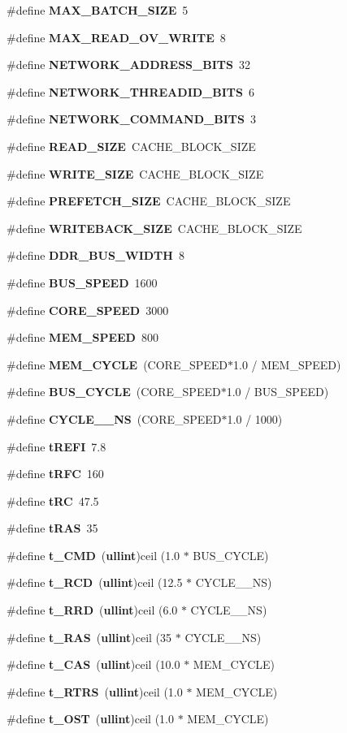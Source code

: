 \begin{CompactItemize}
\#define {\bf MAX\_\-BATCH\_\-SIZE}~5
\item 
\#define {\bf MAX\_\-READ\_\-OV\_\-WRITE}~8
\item 
\#define {\bf NETWORK\_\-ADDRESS\_\-BITS}~32
\item 
\#define {\bf NETWORK\_\-THREADID\_\-BITS}~6
\item 
\#define {\bf NETWORK\_\-COMMAND\_\-BITS}~3
\item 
\#define {\bf READ\_\-SIZE}~CACHE\_\-BLOCK\_\-SIZE
\item 
\#define {\bf WRITE\_\-SIZE}~CACHE\_\-BLOCK\_\-SIZE
\item 
\#define {\bf PREFETCH\_\-SIZE}~CACHE\_\-BLOCK\_\-SIZE
\item 
\#define {\bf WRITEBACK\_\-SIZE}~CACHE\_\-BLOCK\_\-SIZE
\item 
\#define {\bf DDR\_\-BUS\_\-WIDTH}~8
\item 
\#define {\bf BUS\_\-SPEED}~1600
\item 
\#define {\bf CORE\_\-SPEED}~3000
\item 
\#define {\bf MEM\_\-SPEED}~800
\item 
\#define {\bf MEM\_\-CYCLE}~(CORE\_\-SPEED$\ast$1.0 / MEM\_\-SPEED)
\item 
\#define {\bf BUS\_\-CYCLE}~(CORE\_\-SPEED$\ast$1.0 / BUS\_\-SPEED)
\item 
\#define {\bf CYCLE\_\_\-NS}~(CORE\_\-SPEED$\ast$1.0 / 1000)
\item 
\#define {\bf tREFI}~7.8
\item 
\#define {\bf tRFC}~160
\item 
\#define {\bf tRC}~47.5
\item 
\#define {\bf tRAS}~35
\item 
\#define {\bf t\_\-CMD}~({\bf ullint})ceil (1.0 $\ast$ BUS\_\-CYCLE)
\item 
\#define {\bf t\_\-RCD}~({\bf ullint})ceil (12.5 $\ast$ CYCLE\_\_\-NS)
\item 
\#define {\bf t\_\-RRD}~({\bf ullint})ceil (6.0 $\ast$ CYCLE\_\_\-NS)
\item 
\#define {\bf t\_\-RAS}~({\bf ullint})ceil (35 $\ast$ CYCLE\_\_\-NS)
\item 
\#define {\bf t\_\-CAS}~({\bf ullint})ceil (10.0 $\ast$ MEM\_\-CYCLE)
\item 
\#define {\bf t\_\-RTRS}~({\bf ullint})ceil (1.0 $\ast$ MEM\_\-CYCLE)
\item 
\#define {\bf t\_\-OST}~({\bf ullint})ceil (1.0 $\ast$ MEM\_\-CYCLE)
\item 

\end{CompactItemize}
